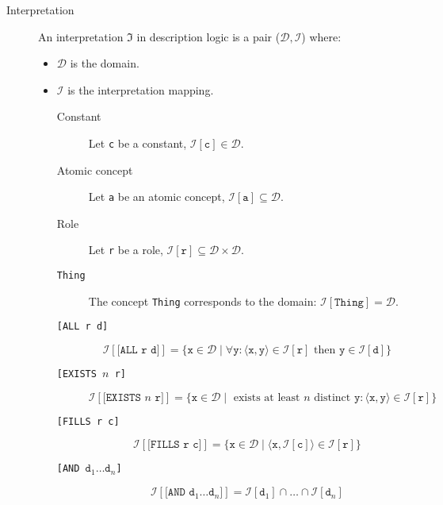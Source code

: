 \begin{description}
    \item[Interpretation] 
        An interpretation $\mathfrak{I}$ in description logic is a pair ($\mathcal{D}, \mathcal{I}$) where:
        \begin{itemize}
            \item $\mathcal{D}$ is the domain.
            \item $\mathcal{I}$ is the interpretation mapping.
                \begin{description}
                    \item[Constant] 
                        Let \texttt{c} be a constant, $\mathcal{I}[\texttt{c}] \in \mathcal{D}$. 
                    \item[Atomic concept] 
                        Let \texttt{a} be an atomic concept, $\mathcal{I}[\texttt{a}] \subseteq \mathcal{D}$. 
                    \item[Role] 
                        Let \texttt{r} be a role, $\mathcal{I}[\texttt{r}] \subseteq \mathcal{D} \times \mathcal{D}$.
                    \item[\texttt{Thing}] 
                        The concept \texttt{Thing} corresponds to the domain: $\mathcal{I}[\texttt{Thing}] = \mathcal{D}$.
                    \item[\texttt{[ALL r d]}]
                        \[
                            \mathcal{I}[\texttt{[ALL r d]}] = 
                            \{ \texttt{x} \in \mathcal{D} \mid \forall \texttt{y}: 
                            \langle \texttt{x}, \texttt{y} \rangle \in \mathcal{I}[\texttt{r}] \text{ then } \texttt{y} \in \mathcal{I}[\texttt{d}] \}
                        \]
                    \item[\texttt{[EXISTS $n$ r]}] 
                        \[ 
                            \mathcal{I}[\texttt{[EXISTS $n$ r]}] = 
                            \{ \texttt{x} \in \mathcal{D} \mid \text{ exists at least $n$ distinct } \texttt{y}: 
                            \langle \texttt{x}, \texttt{y} \rangle \in \mathcal{I}[\texttt{r}] \}
                        \]
                    \item[\texttt{[FILLS r c]}] 
                        \[ 
                            \mathcal{I}[\texttt{[FILLS r c]}] = \{ \texttt{x} \in \mathcal{D} \mid 
                            \langle \texttt{x}, \mathcal{I}[\texttt{c}] \rangle \in \mathcal{I}[\texttt{r}] \} 
                        \]
                    \item[\texttt{[AND $\texttt{d}_1 \dots \texttt{d}_n$]}] 
                        \[ 
                            \mathcal{I}[\texttt{[AND $\texttt{d}_1 \dots \texttt{d}_n$]}] = 
                                \mathcal{I}[\texttt{d}_1] \cap \dots \cap \mathcal{I}[\texttt{d}_n]
                        \]
                \end{description}
        \end{itemize}


\end{description}
